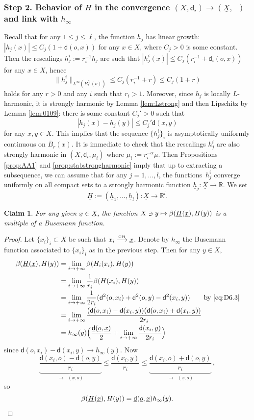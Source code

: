 \documentclass[JEP,XML,SOM,Unicode,published]{cedram}
\newcommand\mto{\mathchoice{\longmapsto}{\mapsto}{\mapsto}{\mapsto}}
\def\To#1{\mathchoice{\xrightarrow{\textstyle\kern4pt#1\kern3pt}}{\stackrel{#1}{\longrightarrow}}{}{}}
\newcommand{\sGH}{{\scriptscriptstyle\mathrm{GH}\,}}
\theoremstyle{plain}
\newtheorem{claim}[theorem]{Claim}
\theoremstyle{definition}
\newcommand{\setR}{\mathbb{R}}
\newcommand{\dist}{\mathsf{d}}
\newcommand{\uX}{\underline{X}}
\DeclareMathOperator{\udist}{\underline{\dist}}
\newcommand{\uo}{\underline{o}}
\newcommand{\ux}{\underline{x}}
\newcommand{\uH}{\underline{H}}
\newcommand{\uh}{\underline{h}}
\begin{document}
\subsubsection*{Step 2. Behavior of $H$ in the convergence $(X,\dist_i) \to (\uX,\udist)$ and link with $h_\infty$}

Recall that for any $1 \le j \le \ell$, the function $h_j$ has linear growth: $|h_j(x)| \le C_j (1+\dist(o,x))$ for any $x \in X$, where $C_j>0$ is some constant. Then the rescalings $h_j^{i}:=r_i^{-1}h_j$ are such that $|h_j^{i}(x)| \le C_j(r_i^{-1}+ \dist_i(o,x))$ for any $x \in X$, hence
\[
\|h_j^{i}\|_{L^\infty(B_r^{\dist_i}(o))} \le C_j(r_i^{-1}+r)\le C_j(1+r)
\]
holds for any $r>0$ and any $i$ such that $r_i>1$. Moreover, since $h_j$ is locally $L$-harmonic, it is strongly harmonic by Lemma \ref{lem:Lstrong} and then Lipschitz by Lemma \ref{lem:0109}: there is some constant $C_j'>0$ such that
\[
|h_j(x)-h_j(y)|\le C_j' \dist(x,y)
\]
for any $x,y \in X$. This implies that the sequence $\{h_j^{i}\}_i$ is asymptotically uniformly continuous on $\overline{B}_r(x)$. It is immediate to check that the rescalings $h_j^{i}$ are also strongly harmonic in $(X,\dist_i,\mu_i)$ where $\mu_i:=r_i^{-\alpha}\mu$. Then Propositions \ref{prop:AA1} and \ref{prop:stabstrongharmonic} imply that up to extracting a subsequence, we can assume that for any $j=1,\dots, l$, the functions~$h_j^{i}$ converge uniformly on all compact sets to a strongly harmonic function $\uh_j: \uX \to \setR$. We set
\[
\uH:= (\uh_1,\ldots,\uh_l): \uX \to \setR^l.
\]

\begin{claim}
For any given $\ux \in \uX$, the function $X \ni y \mto \beta(\uH(\ux),H(y))$ is a multiple of a Busemann function.
\end{claim}

\begin{proof}
Let $\{x_i\}_i \subset X$ be such that $x_i \To{\sGH} \ux$. Denote by $h_\infty$ the Busemann function associated to $\{x_i\}_i$ as in the previous step. Then for any $y \in X$,
\begin{align*}
\beta(\uH(\ux),H(y)) & = \lim_{i \to +\infty} \beta(H_i(x_i),H(y))\\ & = \lim_{i \to +\infty} \frac{1}{r_i} \beta(H(x_i),H(y))\\[-1pt]
& = \lim_{i \to +\infty} \frac{1}{2r_i} (\dist^2(o,x_i)+\dist^2(o,y)-\dist^2(x_i,y)) \qquad \text{by \eqref{eq:D6.3}}\\[-1pt]
& = \lim_{i \to +\infty} \frac{(\dist(o,x_i)-\dist(x_i,y))(\dist(o,x_i)+\dist(x_i,y))}{2r_i}\\[-1pt]
& = h_\infty(y) \Bigl(\frac{\udist(\uo,\ux)}{2} + \lim_{i \to +\infty} \frac{\dist(x_i,y)}{2r_i} \Bigr)
\end{align*}
since $\dist(o,x_i)-\dist(x_i,y) \to h_\infty(y)$. Now
\[
\underbrace{\frac{\dist(x_i,o)-\dist(o,y)}{r_i}}_{\to \udist(\ux,\uo)} \le \frac{\dist(x_i,y)}{r_i} \le \underbrace{\frac{\dist(x_i,o)+\dist(o,y)}{r_i}}_{\to \udist(\ux,\uo)}\,,
\]
so\vspace*{-4pt}
\begin{equation}
\beta(\uH(\ux),H(y)) = \udist(\uo,\ux) h_\infty(y).\qedhere
\end{equation}
\end{proof}
\end{document}
